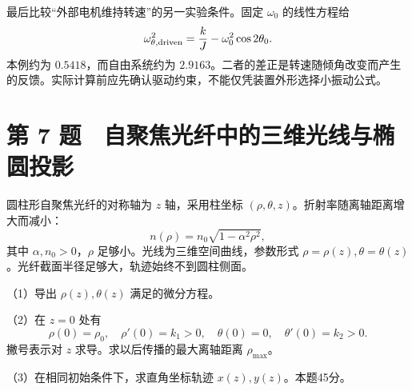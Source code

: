 \documentclass[12pt,a4paper,fontset=fandol]{ctexart}
\begin{document}
最后比较``外部电机维持转速''的另一实验条件。固定 \(\omega_0\)
的线性方程给 \[
\omega_{\theta,\rm driven}^2
=\frac{k}{J}-\omega_0^2\cos2\theta_0.
\] 本例约为 \(0.5418\)，而自由系统约为
\(2.9163\)。二者的差正是转速随倾角改变而产生的反馈。实际计算前应先确认驱动约束，不能仅凭装置外形选择小振动公式。

\clearpage

\section{第 7
题　自聚焦光纤中的三维光线与椭圆投影}\label{ux7b2c-7-ux9898-ux81eaux805aux7126ux5149ux7ea4ux4e2dux7684ux4e09ux7ef4ux5149ux7ebfux4e0eux692dux5706ux6295ux5f71}

圆柱形自聚焦光纤的对称轴为 \(z\) 轴，采用柱坐标
\((\rho,\theta,z)\)。折射率随离轴距离增大而减小： \[
n(\rho)=n_0\sqrt{1-\alpha^2\rho^2},
\] 其中 \(\alpha,n_0>0\)，\(\rho\) 足够小。光线为三维空间曲线，参数形式
\(\rho=\rho(z),\theta=\theta(z)\)。光纤截面半径足够大，轨迹始终不到圆柱侧面。

（1）导出 \(\rho(z),\theta(z)\) 满足的微分方程。

（2）在 \(z=0\) 处有 \[
\rho(0)=\rho_0,\quad \rho'(0)=k_1>0,\quad
\theta(0)=0,\quad\theta'(0)=k_2>0.
\] 撇号表示对 \(z\) 求导。求以后传播的最大离轴距离 \(\rho_{\max}\)。

（3）在相同初始条件下，求直角坐标轨迹 \(x(z),y(z)\)。本题45分。

\begin{center}
\begin{minipage}{\linewidth}
\centering\begingroup
{}
\ifdim\wd\diagrambox>.88\linewidth
\sbox{\diagrambox}{\resizebox{.88\linewidth}{!}{\usebox{\diagrambox}}}
\fi
\ifdim\ht\diagrambox>.40\textheight
\resizebox{!}{.40\textheight}{\usebox{\diagrambox}}
\else\usebox{\diagrambox}\fi
\par{}
\endgroup\end{minipage}
\end{center}
\end{document}
